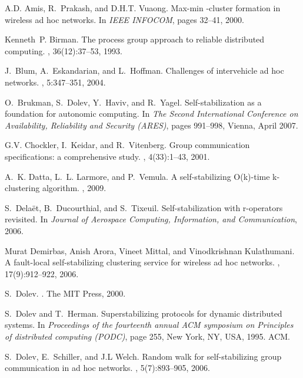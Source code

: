 \documentclass[11pt,english]{article}
\begin{document}
\begin{thebibliography}{10}

A.D. Amis, R.~Prakash, and D.H.T. Vuaong.
\newblock Max-min -cluster formation in wireless ad hoc networks.
\newblock In {\em IEEE INFOCOM}, pages 32--41, 2000.

Kenneth~P. Birman.
\newblock The process group approach to reliable distributed computing.
, 36(12):37--53, 1993.

J.~Blum, A.~Eskandarian, and L.~Hoffman.
\newblock Challenges of intervehicle ad hoc networks.
,
  5:347--351, 2004.

O.~Brukman, S.~Dolev, Y.~Haviv, and R.~Yagel.
\newblock Self-stabilization as a foundation for autonomic computing.
\newblock In {\em The Second International Conference on Availability,
  Reliability and Security ({ARES})}, pages 991--998, Vienna, April 2007.

G.V. Chockler, I.~Keidar, and R.~Vitenberg.
\newblock Group communication specifications: a comprehensive study.
, 4(33):1--43, 2001.

A.~K. Datta, L.~L. Larmore, and P.~Vemula.
\newblock A self-stabilizing {O(k)}-time k-clustering algorithm.
, 2009.

S.~Dela{\"e}t, B.~Ducourthial, and S.~Tixeuil.
\newblock Self-stabilization with r-operators revisited.
\newblock In {\em Journal of Aerospace Computing, Information, and
  Communication}, 2006.

Murat Demirbas, Anish Arora, Vineet Mittal, and Vinodkrishnan Kulathumani.
\newblock A fault-local self-stabilizing clustering service for wireless ad hoc
  networks.
, 17(9):912--922, 2006.

S.~Dolev.
.
\newblock The MIT Press, 2000.

S.~Dolev and T.~Herman.
\newblock Superstabilizing protocols for dynamic distributed systems.
\newblock In {\em Proceedings of the fourteenth annual ACM symposium on
  Principles of distributed computing (PODC)}, page 255, New York, NY, USA,
  1995. ACM.

S.~Dolev, E.~Schiller, and J.L Welch.
\newblock Random walk for self-stabilizing group communication in ad hoc
  networks.
, 5(7):893--905, 2006.


\end{thebibliography}
\end{document}
